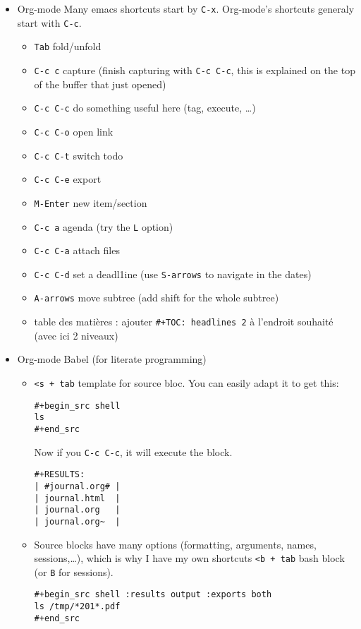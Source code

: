 \documentclass[a4paper]{article}
\begin{document}
\begin{itemize}
\item Org-mode
\label{sec:orgf32b592}
Many emacs shortcuts start by \texttt{C-x}. Org-mode's shortcuts generaly
start with \texttt{C-c}.
\begin{itemize}
\item \texttt{Tab} fold/unfold
\item \texttt{C-c c} capture (finish capturing with \texttt{C-c C-c}, this is explained on
the top of the buffer that just opened)
\item \texttt{C-c C-c} do something useful here (tag, execute, \ldots{})
\item \texttt{C-c C-o} open link
\item \texttt{C-c C-t} switch todo
\item \texttt{C-c C-e} export
\item \texttt{M-Enter} new item/section
\item \texttt{C-c a} agenda (try the \texttt{L} option)
\item \texttt{C-c C-a} attach files
\item \texttt{C-c C-d} set a deadl1ine (use \texttt{S-arrows} to navigate in the dates)
\item \texttt{A-arrows} move subtree (add shift for the whole subtree)
\item table des matières : ajouter  \texttt{\#+TOC: headlines 2} à l'endroit
souhaité (avec ici 2 niveaux)
\end{itemize}
\item Org-mode Babel (for literate programming)
\label{sec:orgcec9a19}
\begin{itemize}
\item \texttt{<s + tab} template for source bloc. You can easily adapt it to get
this:
\begin{verbatim}
#+begin_src shell
ls
#+end_src
\end{verbatim}
Now if you \texttt{C-c C-c}, it will execute the block.
\begin{verbatim}
#+RESULTS:
| #journal.org# |
| journal.html  |
| journal.org   |
| journal.org~  |
\end{verbatim}

\item Source blocks have many options (formatting, arguments, names,
sessions,\ldots{}), which is why I have my own shortcuts \texttt{<b + tab} bash
block (or \texttt{B} for sessions).
\begin{verbatim}
#+begin_src shell :results output :exports both
ls /tmp/*201*.pdf
#+end_src


\end{verbatim}
\end{itemize}
\end{itemize}
\end{document}
